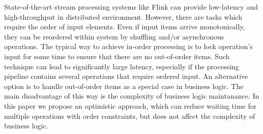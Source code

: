 
State-of-the-art stream processing systems like Flink \cite{carbone2015apache} can provide low-latency and high-throughput in distributed environment. However, there are tasks which require the order of input elements. Even if input items arrive monotonically, they can be reordered within system by shuffling and/or asynchronous operations. The typical way to achieve in-order processing is to lock operation's input for some time to ensure that there are no out-of-order items. Such technique can lead to significantly large latency, especially if  the processing pipeline contains several operations that require ordered input. An alternative option is to handle out-of-order items as a special case in business logic. The main disadvantage of this way is the complexity of business logic maintanance. In this paper we propose an optimistic approach, which can reduce waiting time for multiple operations with order constraints, but does not affect the complexity of business logic.